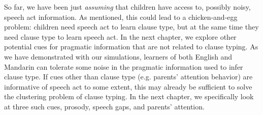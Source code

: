
So far, we have been just \emph{assuming} that children have access to, possibly noisy, speech act information. As mentioned, this could lead to a chicken-and-egg problem: children need speech act to learn clause type, but at the same time they need clause type to learn speech act. In the next chapter, we explore other potential cues for pragmatic information that are not related to clause typing. As we have demonstrated with our simulations, learners of both English and Mandarin can tolerate some noise in the pragmatic information used to infer clause type. If cues other than clause type (e.g. parents' attention behavior) are informative of speech act to some extent, this may already be sufficient to solve the clustering problem of clause typing. In the next chapter, we specifically look at three such cues, prosody, speech gaps, and parents' attention.
